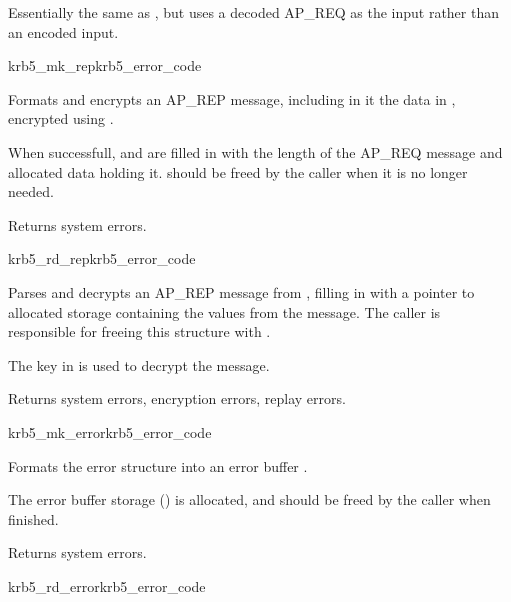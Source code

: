 Essentially the same as , but uses a decoded AP_REQ
as the input rather than an encoded input.

\begin{funcdecl}{krb5_mk_rep}{krb5_error_code}{\funcin}
\funcout
{}
\end{funcdecl}

Formats and encrypts an AP_REP message, including in it the data in
, encrypted using .

When successfull,  and
 are filled in with the length of the
AP_REQ message and allocated data holding it.
 should be freed by the
caller when it is no longer needed.

Returns system errors.

\begin{funcdecl}{krb5_rd_rep}{krb5_error_code}{\funcin}
\funcout
{}
\end{funcdecl}

Parses and decrypts an AP_REP message from , filling in
 with a pointer to  allocated storage containing the
values from the message.  The caller is responsible for freeing this
structure with .

The key in  is used to decrypt the message.

Returns system errors, encryption errors, replay errors.

\begin{funcdecl}{krb5_mk_error}{krb5_error_code}{\funcin}
\funcout
{}
\end{funcdecl}

Formats the error structure  into an error buffer
.

The error buffer storage () is
allocated, and should be freed by the caller when finished.

Returns system errors.

\begin{funcdecl}{krb5_rd_error}{krb5_error_code}{\funcin}
\funcout
{}
\end{funcdecl}

